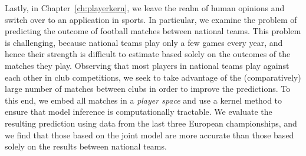 Lastly, in Chapter~\ref{ch:playerkern}, we leave the realm of human opinions and switch over to an application in sports.
In particular, we examine the problem of predicting the outcome of football matches between national teams.
This problem is challenging, because national teams play only a few games every year, and hence their strength is difficult to estimate based solely on the outcomes of the matches they play.
Observing that most players in national teams play against each other in club competitions, we seek to take advantage of the (comparatively) large number of matches between clubs in order to improve the predictions.
To this end, we embed all matches in a \emph{player space} and use a kernel method to ensure that model inference is computationally tractable.
We evaluate the resulting prediction using data from the last three European championships, and we find that those based on the joint model are more accurate than those based solely on the results between national teams.
